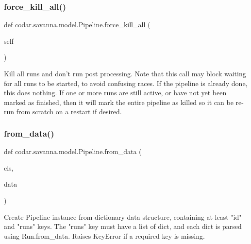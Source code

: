 \subsubsection{\texorpdfstring{force\+\_\+kill\+\_\+all()}{force\_kill\_all()}}
{\footnotesize\ttfamily def codar.\+savanna.\+model.\+Pipeline.\+force\+\_\+kill\+\_\+all (\begin{DoxyParamCaption}\item[{}]{self }\end{DoxyParamCaption})}

\begin{DoxyVerb}Kill all runs and don't run post processing. Note that this call may
block waiting for all runs to be started, to avoid confusing races.
If the pipeline is already done, this does nothing. If one or more
runs are still active, or have not yet been marked as finished, then
it will mark the entire pipeline as killed so it can be re-run from
scratch on a restart if desired.
\end{DoxyVerb}
 \mbox{\label{classcodar_1_1savanna_1_1model_1_1_pipeline_abf71facf9275710199941f0f79997db2}} 
\subsubsection{\texorpdfstring{from\+\_\+data()}{from\_data()}}
{\footnotesize\ttfamily def codar.\+savanna.\+model.\+Pipeline.\+from\+\_\+data (\begin{DoxyParamCaption}\item[{}]{cls,  }\item[{}]{data }\end{DoxyParamCaption})}

\begin{DoxyVerb}Create Pipeline instance from dictionary data structure, containing
at least "id" and "runs" keys. The "runs" key must have a list of dict,
and each dict is parsed using Run.from_data.
Raises KeyError if a required key is missing.\end{DoxyVerb}
 \mbox{\label{classcodar_1_1savanna_1_1model_1_1_pipeline_a559b6f3f07dc06fd1c42a33fff9e96f1}} 
